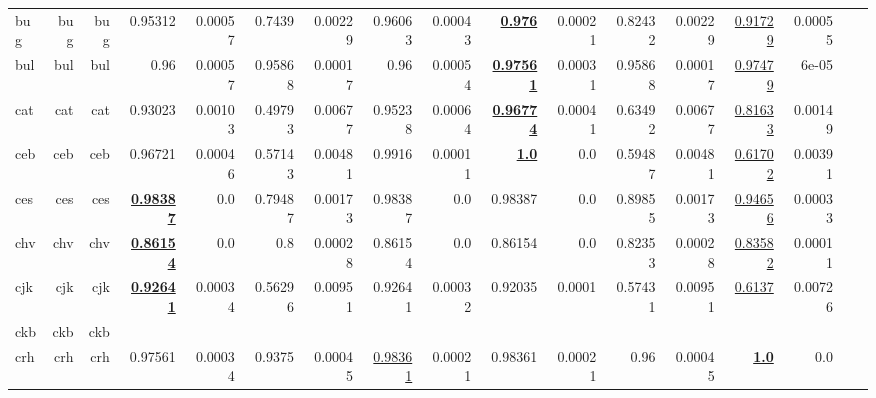 \documentclass[11pt]{article}
\begin{document}
\begin{table*}[h]
{\begin{tabular}{lrrrrrrrrrrrrrrrr}
bug         & bug         & bug         & 0.95312         & 0.00057         & 0.7439         & 0.00229         & 0.96063         & 0.00043         & \textbf{\underline{0.976}}         & 0.00021         & 0.82432         & 0.00229         & \underline{0.91729}         & 0.00055         \\
bul         & bul         & bul         & 0.96         & 0.00057         & 0.95868         & 0.00017         & 0.96         & 0.00054         & \textbf{\underline{0.97561}}         & 0.00031         & 0.95868         & 0.00017         & \underline{0.97479}         & 6e-05         \\
cat         & cat         & cat         & 0.93023         & 0.00103         & 0.49793         & 0.00677         & 0.95238         & 0.00064         & \textbf{\underline{0.96774}}         & 0.00041         & 0.63492         & 0.00677         & \underline{0.81633}         & 0.00149         \\
ceb         & ceb         & ceb         & 0.96721         & 0.00046         & 0.57143         & 0.00481         & 0.9916         & 0.00011         & \textbf{\underline{1.0}}         & 0.0         & 0.59487         & 0.00481         & \underline{0.61702}         & 0.00391         \\
ces         & ces         & ces         & \textbf{\underline{0.98387}}         & 0.0         & 0.79487         & 0.00173         & 0.98387         & 0.0         & 0.98387         & 0.0         & 0.89855         & 0.00173         & \underline{0.94656}         & 0.00033         \\
chv         & chv         & chv         & \textbf{\underline{0.86154}}         & 0.0         & 0.8         & 0.00028         & 0.86154         & 0.0         & 0.86154         & 0.0         & 0.82353         & 0.00028         & \underline{0.83582}         & 0.00011         \\
cjk         & cjk         & cjk         & \textbf{\underline{0.92641}}         & 0.00034         & 0.56296         & 0.00951         & 0.92641         & 0.00032         & 0.92035         & 0.0001         & 0.57431         & 0.00951         & \underline{0.6137}         & 0.00726         \\
ckb         & ckb         & ckb         &         &          &          &          &         &          &         &          &          &          &          &          \\
crh         & crh         & crh         & 0.97561         & 0.00034         & 0.9375         & 0.00045         & \underline{0.98361}         & 0.00021         & 0.98361         & 0.00021         & 0.96         & 0.00045         & \textbf{\underline{1.0}}         & 0.0         \\

\end{tabular}}
\end{table*}
\end{document}
